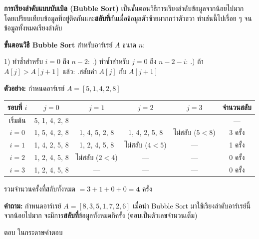 \question \textbf{การเรียงลำดับแบบบับเบิล (Bubble Sort)} เป็นขั้นตอนวิธีการเรียงลำดับข้อมูลจากน้อยไปมาก โดยเปรียบเทียบข้อมูลที่อยู่ติดกันและ\textbf{สลับที่}กันเมื่อข้อมูลตัวซ้ายมากกว่าตัวขวา ทำเช่นนี้ไปเรื่อย ๆ จนข้อมูลทั้งหมดเรียงลำดับ

\medskip
\noindent
\textbf{ขั้นตอนวิธี Bubble Sort} สำหรับอาร์เรย์ $A$ ขนาด $n$:

\begin{pseudocode}
1) ทำซ้ำสำหรับ $i = 0$ ถึง $n-2$:\newline
.) ทำซ้ำสำหรับ $j = 0$ ถึง $n-2-i$:\newline
.\quad{}) ถ้า $A[j] > A[j+1]$ แล้ว:\newline
.\quad\quad\qquad สลับค่า $A[j]$ กับ $A[j+1]$\newline
\end{pseudocode}

\medskip
\textbf{ตัวอย่าง:} กำหนดอาร์เรย์ $A = [5, 1, 4, 2, 8]$

\begin{center}
\begin{tabular}{|c|c|c|c|c|c|}
\hline
\textbf{รอบที่ $i$} & \textbf{$j=0$} & \textbf{$j=1$} & \textbf{$j=2$} & \textbf{$j=3$} & \textbf{จำนวนสลับ} \\
\hline
เริ่มต้น    &  5, 1, 4, 2, 8  &                &                &                & --- \\
$i=0$       &  1, 5, 4, 2, 8  &  1, 4, 5, 2, 8 &  1, 4, 2, 5, 8 &  ไม่สลับ ($5<8$)  & 3 ครั้ง \\
$i=1$       &  1, 4, 2, 5, 8  &  1, 2, 4, 5, 8 &  ไม่สลับ ($4<5$)  &  ---            & 1 ครั้ง \\
$i=2$       &  1, 2, 4, 5, 8  &  ไม่สลับ ($2<4$)  &  ---            &  ---            & 0 ครั้ง \\
$i=3$       &  1, 2, 4, 5, 8  &  ---            &  ---            &  ---            & 0 ครั้ง \\
\hline
\end{tabular}
\end{center}

รวมจำนวนครั้งที่สลับทั้งหมด $= 3 + 1 + 0 + 0 = \textbf{4}$ ครั้ง

\medskip
\textbf{คำถาม:} กำหนดอาร์เรย์ \newline
$A = [8, 3, 5, 1, 7, 2, 6]$ \newline
เมื่อนำ Bubble Sort มาใช้เรียงลำดับอาร์เรย์นี้จากน้อยไปมาก จะมีการ\textbf{สลับที่}ข้อมูลทั้งหมดกี่ครั้ง (ตอบเป็นตัวเลขจำนวนเต็ม)

\par\medskip
ตอบ ในกระดาษคำตอบ
